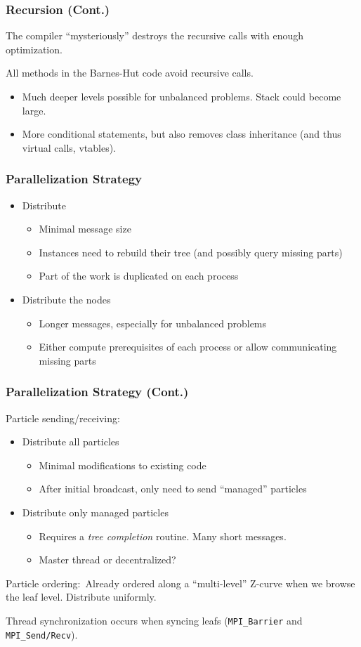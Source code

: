 \begin{frame}
	\frametitle{Recursion (Cont.)}
	The compiler ``mysteriously'' destroys the recursive calls with enough optimization.
	
	All methods in the Barnes-Hut code avoid recursive calls.
	\begin{itemize}
		\item Much deeper levels possible for unbalanced problems. Stack could become large.
		\item More conditional statements, but also removes class inheritance (and thus virtual calls, vtables).
	\end{itemize}
\end{frame}

\begin{frame}
	\frametitle{Parallelization Strategy}
	\begin{itemize}
		\item Distribute \only<2>{\alert{only particles}}
		\begin{itemize}
			\item Minimal message size
			\item Instances need to rebuild their tree (and possibly query missing parts)
			\item Part of the work is duplicated on each process
		\end{itemize}
		\item Distribute the nodes
		\begin{itemize}
			\item Longer messages, especially for unbalanced problems
			\item Either compute prerequisites of each process or allow communicating missing parts
		\end{itemize}
	\end{itemize}
\end{frame}

\begin{frame}
\frametitle{Parallelization Strategy (Cont.)}
Particle sending/receiving:
\begin{itemize}
	\item Distribute all particles
	\begin{itemize}
		\item Minimal modifications to existing code
		\item After initial broadcast, only need to send ``managed'' particles
	\end{itemize}
	\item Distribute only managed particles
	\begin{itemize}
		\item Requires a \emph{tree completion} routine. Many short messages.
		\item Master thread or decentralized?
	\end{itemize}
\end{itemize}
\par
Particle ordering:~Already ordered along a ``multi-level'' Z-curve when we browse the leaf level. Distribute uniformly.
\par
Thread synchronization occurs when syncing leafs (\lstinline|MPI_Barrier| and \lstinline|MPI_Send/Recv|). %
\end{frame}